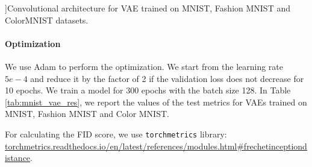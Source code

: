 \begin{table}[ht]
\caption[][\baselineskip]{Convolutional architecture for VAE trained on MNIST, Fashion MNIST and ColorMNIST datasets.}
\label{tab:mnist_arch}
\begin{center}
\end{center}
\vspace*{2\baselineskip}
\end{table}

\paragraph{Optimization} We use Adam to perform the optimization. We start from the learning rate $5e-4$ and reduce it by the factor of 2 if the validation loss does not decrease for 10 epochs. We train a model for 300 epochs with the batch size 128. In Table \ref{tab:mnist_vae_res}, we report the values of the test metrics for VAEs trained on MNIST, Fashion MNIST and Color MNIST. 

For calculating the FID score, we use \texttt{torchmetrics} library: \url{torchmetrics.readthedocs.io/en/latest/references/modules.html#frechetinceptiondistance}.

